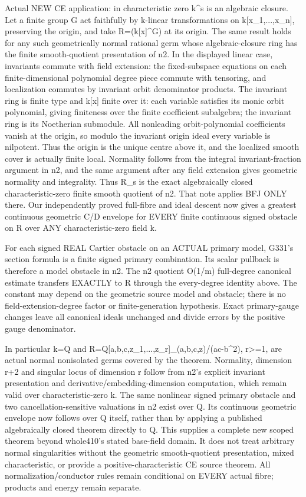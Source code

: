 \documentclass[11pt]{article}
\begin{document}
Actual NEW CE application: in characteristic zero k\textasciicircum{}s is an algebraic closure. Let a finite group G act faithfully by k-linear transformations on k[x\_1,...,x\_n], preserving the origin, and take R=(k[x]\textasciicircum{}G) at its origin. The same result holds for any such geometrically normal rational germ whose algebraic-closure ring has the finite smooth-quotient presentation of n2. In the displayed linear case, invariants commute with field extension: the fixed-subspace equations on each finite-dimensional polynomial degree piece commute with tensoring, and localization commutes by invariant orbit denominator products. The invariant ring is finite type and k[x] finite over it: each variable satisfies its monic orbit polynomial, giving finiteness over the finite coefficient subalgebra; the invariant ring is its Noetherian submodule. All nonleading orbit-polynomial coefficients vanish at the origin, so modulo the invariant origin ideal every variable is nilpotent. Thus the origin is the unique centre above it, and the localized smooth cover is actually finite local. Normality follows from the integral invariant-fraction argument in n2, and the same argument after any field extension gives geometric normality and integrality. Thus R\_s is the exact algebraically closed characteristic-zero finite smooth quotient of n2. That note applies BFJ ONLY there. Our independently proved full-fibre and ideal descent now gives a greatest continuous geometric C/D envelope for EVERY finite continuous signed obstacle on R over ANY characteristic-zero field k.

For each signed REAL Cartier obstacle on an ACTUAL primary model, G331's section formula is a finite signed primary combination. Its scalar pullback is therefore a model obstacle in n2. The n2 quotient O(1/m) full-degree canonical estimate transfers EXACTLY to R through the every-degree identity above. The constant may depend on the geometric source model and obstacle; there is no field-extension-degree factor or finite-generation hypothesis. Exact primary-gauge changes leave all canonical ideals unchanged and divide errors by the positive gauge denominator.

In particular k=Q and R=Q[a,b,c,z\_1,...,z\_r]\_(a,b,c,z)/(ac-b\textasciicircum{}2), r\textgreater{}=1, are actual normal nonisolated germs covered by the theorem. Normality, dimension r+2 and singular locus of dimension r follow from n2's explicit invariant presentation and derivative/embedding-dimension computation, which remain valid over characteristic-zero k. The same nonlinear signed primary obstacle and two cancellation-sensitive valuations in n2 exist over Q. Its continuous geometric envelope now follows over Q itself, rather than by applying a published algebraically closed theorem directly to Q. This supplies a complete new scoped theorem beyond whole410's stated base-field domain. It does not treat arbitrary normal singularities without the geometric smooth-quotient presentation, mixed characteristic, or provide a positive-characteristic CE source theorem. All normalization/conductor rules remain conditional on EVERY actual fibre; products and energy remain separate.
\end{document}

